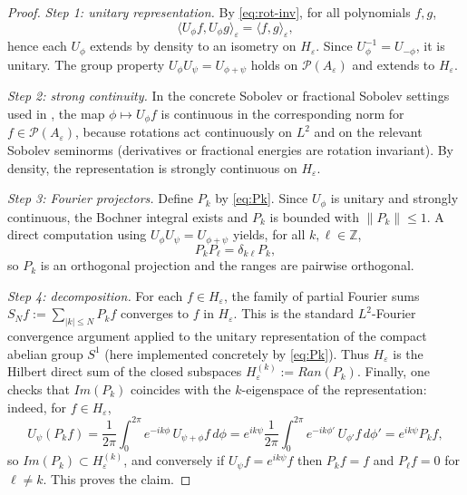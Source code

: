 \documentclass{amsart}
\numberwithin{equation}{section}
\theoremstyle{definition}
\theoremstyle{remark}
\begin{document}
\begin{proof}
\emph{Step 1: unitary representation.}
By \eqref{eq:rot-inv}, for all polynomials $f,g$,
\[
\langle U_\phi f, U_\phi g\rangle_{\varepsilon} = \langle f,g\rangle_{\varepsilon},
\]
hence each $U_\phi$ extends by density to an isometry on $H_\varepsilon$.
Since $U_\phi^{-1}=U_{-\phi}$, it is unitary. The group property
$U_\phi U_\psi = U_{\phi+\psi}$ holds on $\mathcal P(A_\varepsilon)$ and extends to $H_\varepsilon$.

\emph{Step 2: strong continuity.}
In the concrete Sobolev or fractional Sobolev settings used in \cite{MagnotThinAnnuli},
the map $\phi\mapsto U_\phi f$ is continuous in the corresponding norm for $f\in\mathcal P(A_\varepsilon)$,
because rotations act continuously on $L^2$ and on the relevant Sobolev seminorms
(derivatives or fractional energies are rotation invariant). By density, the representation
is strongly continuous on $H_\varepsilon$.

\emph{Step 3: Fourier projectors.}
Define $P_k$ by \eqref{eq:Pk}. Since $U_\phi$ is unitary and strongly continuous, the
Bochner integral exists and $P_k$ is bounded with $\|P_k\|\le 1$.
A direct computation using $U_\phi U_\psi = U_{\phi+\psi}$ yields, for all $k,\ell\in\mathbb Z$,
\[
P_k P_\ell = \delta_{k\ell} P_k,
\]
so $P_k$ is an orthogonal projection and the ranges are pairwise orthogonal.

\emph{Step 4: decomposition.}
For each $f\in H_\varepsilon$, the family of partial Fourier sums
$S_N f := \sum_{|k|\le N} P_k f$ converges to $f$ in $H_\varepsilon$.
This is the standard $L^2$-Fourier convergence argument applied to the unitary representation
of the compact abelian group $S^1$ (here implemented concretely by \eqref{eq:Pk}).
Thus $H_\varepsilon$ is the Hilbert direct sum of the closed subspaces $H_\varepsilon^{(k)}:=Ran(P_k)$.
Finally, one checks that $Im(P_k)$ coincides with the $k$-eigenspace of the representation:
indeed, for $f\in H_\varepsilon$,
\[
U_\psi(P_k f)
=
\frac{1}{2\pi}\int_0^{2\pi} e^{-ik\phi}\,U_{\psi+\phi}f\,d\phi
=
e^{ik\psi}\frac{1}{2\pi}\int_0^{2\pi} e^{-ik\phi'}\,U_{\phi'}f\,d\phi'
=
e^{ik\psi} P_k f,
\]
so $Im(P_k)\subset H_\varepsilon^{(k)}$, and conversely if $U_\psi f=e^{ik\psi}f$ then $P_k f=f$ and
$P_\ell f=0$ for $\ell\ne k$. This proves the claim.
\end{proof}
\end{document}
